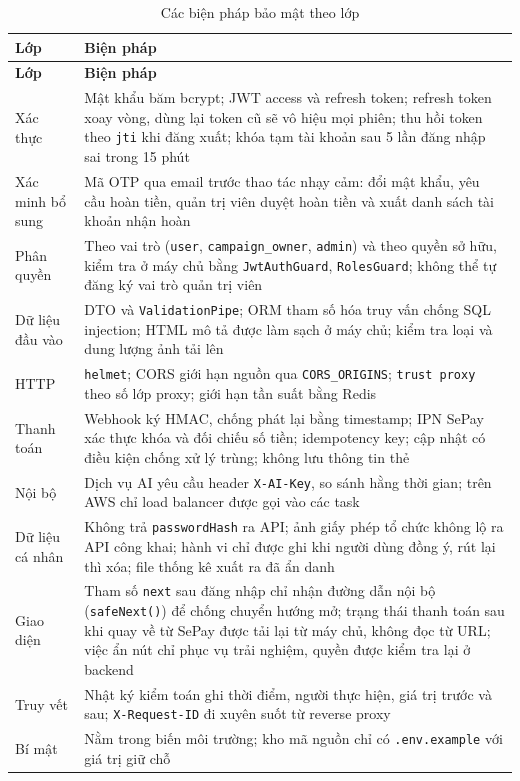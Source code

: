 \begin{longtable}{|P{3.0cm}|p{10.8cm}|}
    \caption{Các biện pháp bảo mật theo lớp}
    \label{tab:bao_mat} \\
    \hline
    \textbf{Lớp} & \textbf{Biện pháp} \\
    \hline
    \endfirsthead
    \hline
    \textbf{Lớp} & \textbf{Biện pháp} \\
    \hline
    \endhead
    Xác thực & Mật khẩu băm bcrypt; JWT access và refresh token; refresh token xoay vòng, dùng lại token cũ sẽ vô hiệu mọi phiên; thu hồi token theo \texttt{jti} khi đăng xuất; khóa tạm tài khoản sau 5 lần đăng nhập sai trong 15 phút \\
    \hline
    Xác minh bổ sung & Mã OTP qua email trước thao tác nhạy cảm: đổi mật khẩu, yêu cầu hoàn tiền, quản trị viên duyệt hoàn tiền và xuất danh sách tài khoản nhận hoàn \\
    \hline
    Phân quyền & Theo vai trò (\texttt{user}, \texttt{campaign\_owner}, \texttt{admin}) và theo quyền sở hữu, kiểm tra ở máy chủ bằng \texttt{JwtAuthGuard}, \texttt{RolesGuard}; không thể tự đăng ký vai trò quản trị viên \\
    \hline
    Dữ liệu đầu vào & DTO và \texttt{ValidationPipe}; ORM tham số hóa truy vấn chống SQL injection; HTML mô tả được làm sạch ở máy chủ; kiểm tra loại và dung lượng ảnh tải lên \\
    \hline
    HTTP & \texttt{helmet}; CORS giới hạn nguồn qua \texttt{CORS\_ORIGINS}; \texttt{trust proxy} theo số lớp proxy; giới hạn tần suất bằng Redis \\
    \hline
    Thanh toán & Webhook ký HMAC, chống phát lại bằng timestamp; IPN SePay xác thực khóa và đối chiếu số tiền; idempotency key; cập nhật có điều kiện chống xử lý trùng; không lưu thông tin thẻ \\
    \hline
    Nội bộ & Dịch vụ AI yêu cầu header \texttt{X-AI-Key}, so sánh hằng thời gian; trên AWS chỉ load balancer được gọi vào các task \\
    \hline
    Dữ liệu cá nhân & Không trả \texttt{passwordHash} ra API; ảnh giấy phép tổ chức không lộ ra API công khai; hành vi chỉ được ghi khi người dùng đồng ý, rút lại thì xóa; file thống kê xuất ra đã ẩn danh \\
    \hline
    Giao diện & Tham số \texttt{next} sau đăng nhập chỉ nhận đường dẫn nội bộ (\texttt{safeNext()}) để chống chuyển hướng mở; trạng thái thanh toán sau khi quay về từ SePay được tải lại từ máy chủ, không đọc từ URL; việc ẩn nút chỉ phục vụ trải nghiệm, quyền được kiểm tra lại ở backend \\
    \hline
    Truy vết & Nhật ký kiểm toán ghi thời điểm, người thực hiện, giá trị trước và sau; \texttt{X-Request-ID} đi xuyên suốt từ reverse proxy \\
    \hline
    Bí mật & Nằm trong biến môi trường; kho mã nguồn chỉ có \texttt{.env.example} với giá trị giữ chỗ \\
    \hline
\end{longtable}
